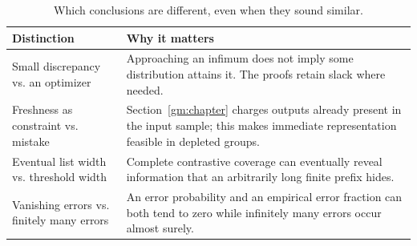 \begin{table}[H]
\centering\small
\caption{Which conclusions are different, even when they sound similar.}\label{tab:distinctions}
\begin{tabularx}{\textwidth}{@{}p{}Y@{}}
\toprule
\textbf{Distinction} & \textbf{Why it matters}\\
\midrule
Small discrepancy vs. an optimizer & Approaching an infimum does not imply some distribution attains it. The proofs retain slack where needed.\\
\addlinespace
Freshness as constraint vs. mistake & Section~\ref{gm:chapter} charges outputs already present in the input sample; this makes immediate representation feasible in depleted groups.\\
\addlinespace
Eventual list width vs. threshold width & Complete contrastive coverage can eventually reveal information that an arbitrarily long finite prefix hides.\\
\addlinespace
Vanishing errors vs. finitely many errors & An error probability and an empirical error fraction can both tend to zero while infinitely many errors occur almost surely.\\
\bottomrule
\end{tabularx}
\end{table}
\clearpage

